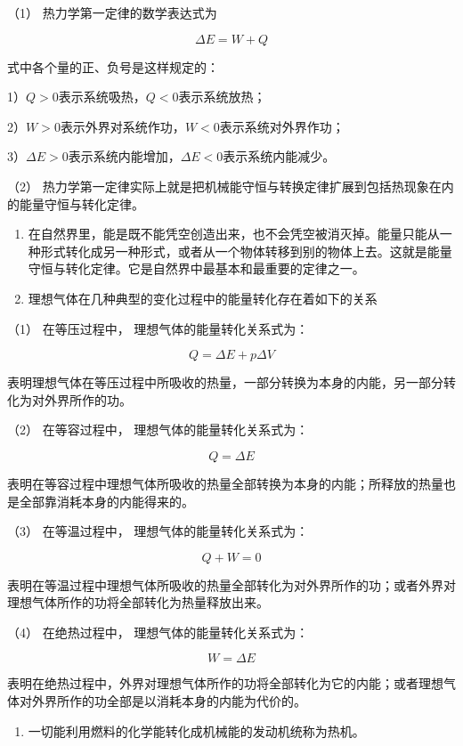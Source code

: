 （1） 热力学第一定律的数学表达式为

\[
\Delta E = W + Q
\]

式中各个量的正、负号是这样规定的：

1）\(Q > 0\)表示系统吸热，\(Q < 0\)表示系统放热；

2）\(W > 0\)表示外界对系统作功，\(W < 0\)表示系统对外界作功；

3）\(\Delta E > 0\)表示系统内能增加，\(\Delta E < 0\)表示系统内能减少。

（2）
热力学第一定律实际上就是把机械能守恒与转换定律扩展到包括热现象在内的能量守恒与转化定律。

\begin{enumerate}
\def\labelenumi{\arabic{enumi}.}
\setcounter{enumi}{2}
\item
  在自然界里，能是既不能凭空创造出来，也不会凭空被消灭掉。能量只能从一种形式转化成另一种形式，或者从一个物体转移到别的物体上去。这就是能量守恒与转化定律。它是自然界中最基本和最重要的定律之一。
\item
  理想气体在几种典型的变化过程中的能量转化存在着如下的关系
\end{enumerate}

（1） 在等压过程中， 理想气体的能量转化关系式为：

\[
Q = \Delta E + p \Delta V
\]

表明理想气体在等压过程中所吸收的热量，一部分转换为本身的内能，另一部分转化为对外界所作的功。

（2） 在等容过程中， 理想气体的能量转化关系式为：

\[
Q = \Delta E
\]

表明在等容过程中理想气体所吸收的热量全部转换为本身的内能；所释放的热量也是全部靠消耗本身的内能得来的。

（3） 在等温过程中， 理想气体的能量转化关系式为：

\[
Q+W=0
\]

表明在等温过程中理想气体所吸收的热量全部转化为对外界所作的功；或者外界对理想气体所作的功将全部转化为热量释放出来。

（4） 在绝热过程中， 理想气体的能量转化关系式为：

\[
W = \Delta E
\]

表明在绝热过程中，外界对理想气体所作的功将全部转化为它的内能；或者理想气体对外界所作的功全部是以消耗本身的内能为代价的。

\begin{enumerate}
\def\labelenumi{\arabic{enumi}.}
\setcounter{enumi}{4}
\tightlist
\item
  一切能利用燃料的化学能转化成机械能的发动机统称为热机。
\end{enumerate}

